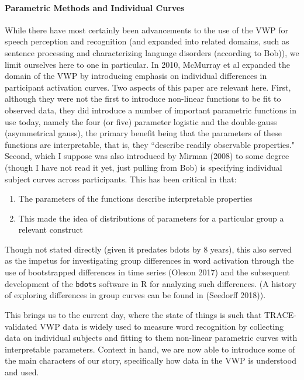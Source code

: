 \documentclass{article}
\newcommand{\xt}{\texttt}%
\begin{document}
\paragraph{Parametric Methods and Individual Curves} While there have most certainly been advancements to the use of the VWP for speech perception and recognition (and expanded into related domains, such as sentence processing and characterizing language disorders (according to Bob)), we  limit ourselves here to one in particular. In 2010, McMurray et al expanded the domain of the VWP by introducing emphasis on individual differences in participant activation curves. Two aspects of this paper are relevant here. First, although they were not the first to introduce non-linear functions to be fit to observed data, they did introduce a number of important parametric functions in use today, namely the four (or five) parameter logistic and the double-gauss (asymmetrical gauss), the primary benefit being that the parameters of these functions are interpretable, that is, they ``describe readily observable properties." Second, which I suppose was also introduced by Mirman (2008) to some degree (though I have not read it yet, just pulling from Bob) is specifying individual subject curves across participants. This has been critical in that:

\begin{singlespace}
\begin{enumerate}
\vspace{-3mm}
\item The parameters of the functions describe interpretable properties
\item This made the idea of distributions of parameters for a particular group a relevant construct
\end{enumerate}
\end{singlespace}

Though not stated directly (given it predates bdots by 8 years), this also served as the impetus for investigating group differences in word activation through the use of bootstrapped differences in time series (Oleson 2017) and the subsequent development of the \xt{bdots} software in R for analyzing such differences. (A history of exploring differences in group curves can be found in (Seedorff 2018)).

This brings us to the current day, where the state of things is such that TRACE-validated VWP data is widely used to measure word recognition by collecting data on individual subjects and fitting to them non-linear parametric curves with interpretable parameters. Context in hand, we are now able to introduce some of the main characters of our story, specifically how data in the VWP is understood and used. 
\end{document}

